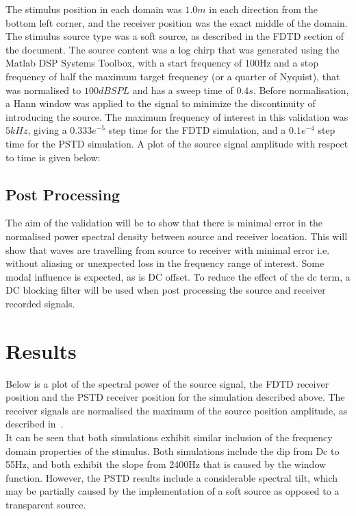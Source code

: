 The stimulus position in each domain was $1.0m$ in each direction from the bottom left corner, and the receiver position was the exact middle of the domain. The stimulus source type was a soft source, as described in the FDTD section of the document. The source content was a log chirp that was generated using the Matlab DSP Systems Toolbox, with a start frequency of 100Hz and a stop frequency of half the maximum target frequency (or a quarter of Nyquist), that was normalised to $100dBSPL$ and has a sweep time of $0.4s$. Before normalisation, a Hann window was applied to the signal to minimize the discontinuity of introducing the source. The maximum frequency of interest in this validation was $5kHz$, giving a $0.333e^{-5}$ step time for the FDTD simulation, and a $0.1e^{-4}$ step time for the PSTD simulation. A plot of the source signal amplitude with respect to time is given below:\\

\subsection{Post Processing}
The aim of the validation will be to show that there is minimal error in the normalised power spectral density between source and receiver location. This will show that waves are travelling from source to receiver with minimal error i.e. without aliasing or unexpected loss in the frequency range of interest. Some modal influence is expected, as is DC offset. To reduce the effect of the dc term, a DC blocking filter will be used when post processing the source and receiver recorded signals.

\section{Results}
Below is a plot of the spectral power of the source signal, the FDTD receiver position and the PSTD receiver position for the simulation described above. The receiver signals are normalised the maximum of the source position amplitude, as described in~\cite{Murphy2014}.\\ 

It can be seen that both simulations exhibit similar inclusion of the frequency domain properties of the stimulus. Both simulations include the dip from Dc to 55Hz, and both exhibit the slope from 2400Hz that is caused by the window function. However, the PSTD results include a considerable spectral tilt, which may be partially caused by the implementation of a soft source as opposed to a transparent source.\\


